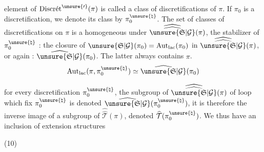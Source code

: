 
 element of $\operatorname{Discr\acute{e}t}^{\unsure{\prime}}(\pi)$ is called a
class of discretifications of $\pi$.
If $\pi_0$ is a discretification, we denote its class by
$\pi_0^{\unsure{\natural}}$. The set of classes of discretifications on $\pi$
is a homogeneous  under $\widehat{\widehat{\unsure{\mathfrak{S}|\mathcal{G}}}}(\pi)$, the stabilizer
of $\pi_0^{\unsure{\natural}}$  : the closure of
$\unsure{\mathfrak{S}|\mathcal{G}}(\pi_0)=\operatorname{Aut}_{\mathrm{lac}}(\pi_0)$ in
$\widehat{\widehat{\unsure{\mathfrak{S}|\mathcal{G}}}}(\pi)$, or again :
$\widehat{\unsure{\mathfrak{S}|\mathcal{G}}}(\pi_0)$.
The latter always contains $\pi$.
\[
\operatorname{Aut}_{\mathrm{lac}}(\pi,\pi_0^{\unsure{\natural}})
\simeq\widehat{\unsure{\mathfrak{S}|\mathcal{G}}}(\pi_0)
\]

 for every discretification $\pi_0^{\unsure{\natural}}$, the subgroup of
$\widehat{\widehat{\unsure{\mathfrak{S}|\mathcal{G}}}}(\pi)$ of loop  which fix
$\pi_0^{\unsure{\natural}}$ is denoted $\widehat{\unsure{\mathfrak{S}|\mathcal{G}}}(\pi_0^{\unsure{\natural}})$,
it is therefore the inverse image of a subgroup of
$\widehat{\widehat{\mathcal{T}}}(\pi)$, denoted
$\widehat{\mathcal{T}}(\pi_0^{\unsure{\natural}})$. We thus have an inclusion of
extension structures

\begin{samepage}
(10)
\end{samepage}


